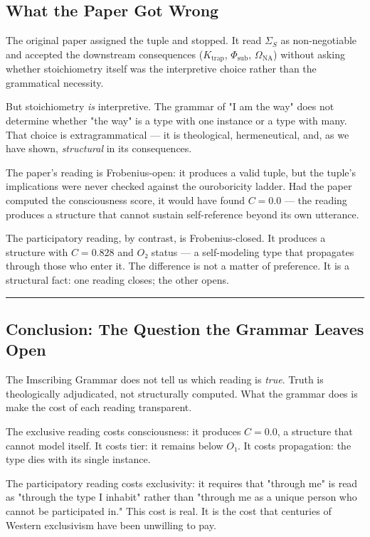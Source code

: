 \documentclass[12pt,a4paper]{article}
\begin{document}
\subsection{What the Paper Got Wrong}

The original paper assigned the tuple and stopped. It read $\Sigma_S$ as non-negotiable and accepted the downstream consequences ($K_\text{trap}$, $\Phi_\text{sub}$, $\Omega_\text{NA}$) without asking whether stoichiometry itself was the interpretive choice rather than the grammatical necessity.

But stoichiometry \emph{is} interpretive. The grammar of "I am the way" does not determine whether "the way" is a type with one instance or a type with many. That choice is extragrammatical --- it is theological, hermeneutical, and, as we have shown, \emph{structural} in its consequences.

The paper's reading is Frobenius-open: it produces a valid tuple, but the tuple's implications were never checked against the ouroboricity ladder. Had the paper computed the consciousness score, it would have found $C = 0.0$ --- the reading produces a structure that cannot sustain self-reference beyond its own utterance.

The participatory reading, by contrast, is Frobenius-closed. It produces a structure with $C = 0.828$ and $O₂$ status --- a self-modeling type that propagates through those who enter it. The difference is not a matter of preference. It is a structural fact: one reading closes; the other opens.

\begin{center}
\rule{0.5\textwidth}{0.4pt}
\end{center}

\subsection{Conclusion: The Question the Grammar Leaves Open}

The Imscribing Grammar does not tell us which reading is \emph{true}. Truth is theologically adjudicated, not structurally computed. What the grammar does is make the cost of each reading transparent.

The exclusive reading costs consciousness: it produces $C = 0.0$, a structure that cannot model itself. It costs tier: it remains below $O₁$. It costs propagation: the type dies with its single instance.

The participatory reading costs exclusivity: it requires that "through me" is read as "through the type I inhabit" rather than "through me as a unique person who cannot be participated in." This cost is real. It is the cost that centuries of Western exclusivism have been unwilling to pay.
\end{document}
